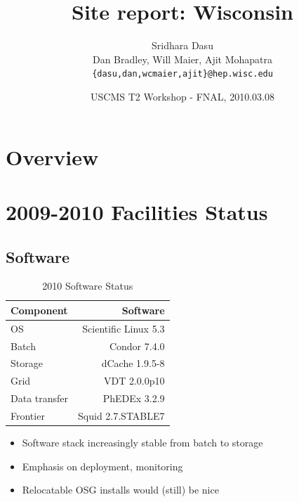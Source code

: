 \documentclass{beamer}
\title{Site report: Wisconsin}
\author[Maier]{
	Sridhara Dasu \\
	Dan Bradley, Will Maier, Ajit Mohapatra
	{\tt \{dasu,dan,wcmaier,ajit\}@hep.wisc.edu}}
\institute[Wisconsin]{University of Wisconsin - High Energy Physics}
\date[2010.03.08]{USCMS T2 Workshop - FNAL, 2010.03.08}
\begin{document}

\begin{frame}
	\titlepage
\end{frame}

\section{Overview}
\begin{frame}
	\tableofcontents
\end{frame}

\section{2009-2010 Facilities Status}
\subsection{Software}
\begin{frame}
\begin{table}
\begin{tabular}{lr}
	\toprule
	Component	 		& Software \\
	\midrule
	OS						& Scientific Linux 5.3 \\
	Batch			 		& Condor 7.4.0 \\
	Storage		 		& dCache 1.9.5-8 \\
	Grid					& VDT 2.0.0p10 \\
	Data transfer	&	PhEDEx 3.2.9 \\
	Frontier			& Squid 2.7.STABLE7 \\
	\bottomrule
\end{tabular}
\caption{2010 Software Status}
\label{2010_software_status}
\end{table}

\begin{itemize}
	\item Software stack increasingly stable from batch to storage
	\item Emphasis on deployment, monitoring
	\item Relocatable OSG installs would (still) be nice
\end{itemize}

\end{frame}
\end{document}
